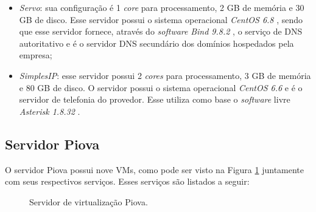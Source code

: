 \begin{itemize}
 \item \textit{Servo}: sua configuração é 1 \textit{core} para processamento, 2 GB de memória e 30 GB de disco. Esse servidor possui o 
 sistema operacional \textit{CentOS 6.8} \cite{centos}, sendo que esse servidor fornece, através do \textit{software} \textit{Bind 9.8.2} 
 \cite{bind}, o serviço de \ac{DNS} autoritativo e é o servidor \ac{DNS} secundário dos domínios hospedados pela empresa;
 
 \item \textit{SimplesIP}: esse servidor possui 2 \textit{cores} para processamento, 3 GB de memória e 80 GB de disco. O servidor possui 
 o sistema operacional \textit{CentOS 6.6} \cite{centos} e é o servidor de telefonia do provedor. Esse utiliza como base o \textit{software} 
 livre \textit{Asterisk 1.8.32} \cite{asterisk}.
\end{itemize}

\subsection{Servidor Piova}
\label{section:serv_piova}

O servidor Piova possui nove \ac{VM}s, como pode ser visto na Figura \ref{fig:servidor_piova} juntamente com seus respectivos serviços. 
Esses serviços são listados a seguir:

\begin{figure}[h!]
 \centering
 \caption{Servidor de virtualização Piova.}
 \label{fig:servidor_piova}
\end{figure}

